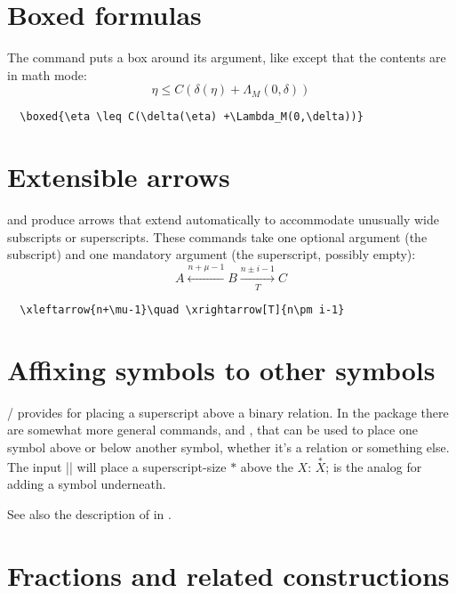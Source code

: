 \documentclass[leqno,titlepage,openany]{amsldoc}
\begin{document}
\section{Boxed formulas}

The command  puts a box around its
argument, like  except that the contents are in math mode:
\begin{equation}
\boxed{\eta \leq C(\delta(\eta) +\Lambda_M(0,\delta))}
\end{equation}
\begin{verbatim}
  \boxed{\eta \leq C(\delta(\eta) +\Lambda_M(0,\delta))}
\end{verbatim}

\section{Extensible arrows}

 and  produce
arrows that extend automatically to accommodate
unusually wide subscripts or superscripts. These commands take one
optional argument (the subscript) and one mandatory argument (the
superscript, possibly empty):
\begin{equation}
A\xleftarrow{n+\mu-1}B \xrightarrow[T]{n\pm i-1}C
\end{equation}
\begin{verbatim}
  \xleftarrow{n+\mu-1}\quad \xrightarrow[T]{n\pm i-1}
\end{verbatim}

\section{Affixing symbols to other symbols}

\latex/ provides  for placing a
superscript above a binary relation.
In the  package there are somewhat more general commands,
 and , that can be used to place one symbol
above or below another symbol, whether it's a relation or something
else. The input || will place a superscript-size $*$ above
the $X$: $\overset{*}{X}$;  is the analog for adding a
symbol underneath.

See also the description of  in .

\section{Fractions and related constructions}
\end{document}
